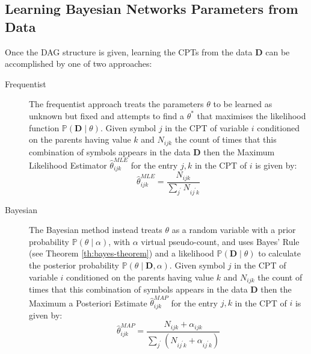 \subsection{Learning Bayesian Networks Parameters from Data} \label{subsec:learning-bn-parameters}
Once the DAG structure is given, learning the CPTs from the data $\boldsymbol{D}$ can be accomplished by one of two approaches:
\begin{description}
	\item[Frequentist] The frequentist approach treats the parameters $\theta$ to be learned as unknown but fixed and attempts to find a $\theta^*$ that maximises the likelihood function $\mathbb{P}(\boldsymbol{D} \mid \theta)$.
		Given symbol $j$ in the CPT of variable $i$ conditioned on the parents having value $k$ and $N_{i j k}$ the count of times that this combination of symbols appears in the data $\boldsymbol{D}$ then the Maximum Likelihood Estimator $\hat{\theta}_{i j k}^{MLE}$ for the entry $j,k$ in the CPT of $i$ is given by:
	\begin{equation}
		\hat{\theta}_{i j k}^{MLE}=\frac{N_{i j k}}{\sum\limits_{j^{\prime}} N_{i j^{\prime} k}}
	\end{equation}
	\item[Bayesian] The Bayesian method instead treats $\theta$ as a random variable with a prior probability $\mathbb{P}(\theta \mid \alpha)$, with $\alpha$ virtual pseudo-count, and uses Bayes' Rule (see Theorem \ref{th:bayes-theorem}) and a likelihood $\mathbb{P}(\boldsymbol{D} \mid \theta)$ to calculate the posterior probability $\mathbb{P}( \theta \mid \boldsymbol{D}, \alpha)$.
		Given symbol $j$ in the CPT of variable $i$ conditioned on the parents having value $k$ and $N_{i j k}$ the count of times that this combination of symbols appears in the data $\boldsymbol{D}$ then the Maximum a Posteriori Estimate $\hat{\theta}_{i j k}^{MAP}$ for the entry $j,k$ in the CPT of $i$ is given by:
		\begin{equation}
			\hat{\theta}_{i j k}^{MAP}=\frac{N_{i j k}+\alpha_{i j k}}{\sum\limits_{j^{\prime}}\left(N_{i j^{\prime} k}+\alpha_{i j^{\prime} k}\right)}
		\end{equation}	
\end{description}

